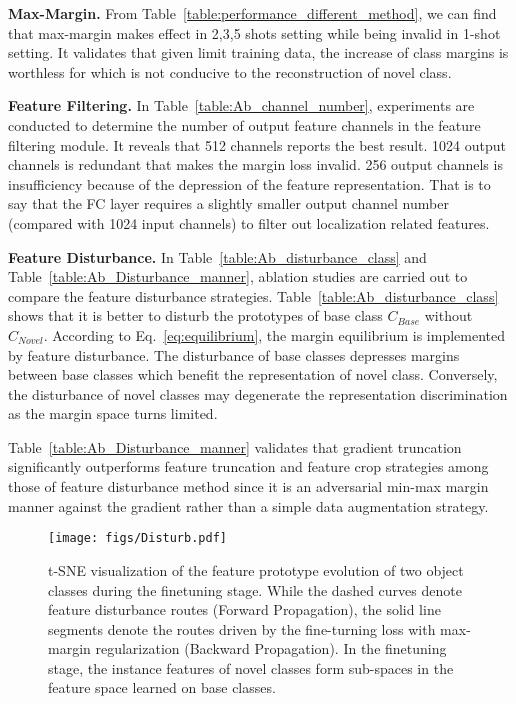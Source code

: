 \documentclass[final]{cvpr}
\begin{document}
\textbf{Max-Margin.} From Table\ \ref{table:performance_different_method}, we can find that max-margin makes effect in 2,3,5 shots setting while being invalid in 1-shot setting. It validates that given limit training data, the increase of class margins is worthless for which is not conducive to the reconstruction of novel class.

\textbf{Feature Filtering.}  In Table~\ref{table:Ab_channel_number}, experiments are conducted to determine the number of output feature channels in the feature filtering module. It reveals that 512 channels reports the best result. 1024 output channels is redundant that makes the margin loss invalid. 256 output channels is insufficiency because of the depression of the feature representation. That is to say that the FC layer requires a slightly smaller output channel number (compared with 1024 input channels) to filter out localization related features.

\textbf{Feature Disturbance.} In Table~\ref{table:Ab_disturbance_class} and Table\ \ref{table:Ab_Disturbance_manner}, ablation studies are carried out to compare the feature disturbance strategies. Table~\ref{table:Ab_disturbance_class} shows that it is better to disturb the prototypes of base class $C_{Base}$ without $C_{Novel}$. According to Eq.\ \ref{eq:equilibrium}, the margin equilibrium is implemented by feature disturbance. The disturbance of base classes depresses margins between base classes which benefit the representation of novel class. Conversely, the disturbance of novel classes may degenerate the representation discrimination as the margin space turns limited. 

Table\ \ref{table:Ab_Disturbance_manner} validates that gradient truncation significantly outperforms feature truncation and feature crop strategies among those of feature disturbance method since it is an adversarial min-max margin manner against the gradient rather than a simple data augmentation strategy.

\begin{figure}[t]
\centering
\texttt{[image: figs/Disturb.pdf]}
\caption{t-SNE visualization of the feature prototype evolution of two object classes during the finetuning stage. While the dashed curves denote feature disturbance routes (Forward Propagation), the solid line segments denote the routes driven by the fine-turning loss with max-margin regularization (Backward Propagation). In the finetuning stage, the instance features of novel classes form sub-spaces in the feature space learned on base classes.}
\label{fig:Disturbance}
\end{figure}
\end{document}
